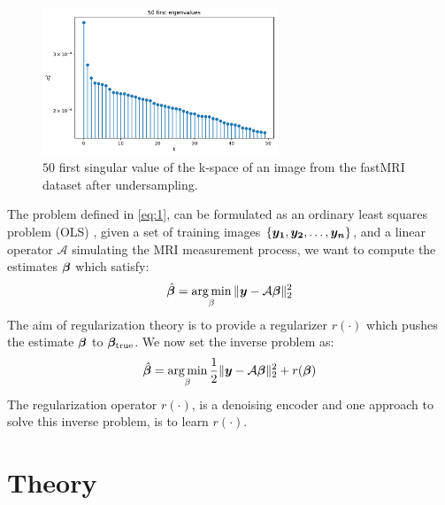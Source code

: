 \documentclass{article}
\begin{document}
\begin{figure}[H]
		\centering
		\captionsetup{justification=centering}
		\includegraphics[width=200pt]{variance_plot_log.pdf}
		\caption{$50$ first singular value of the k-space of an image from the fastMRI dataset after undersampling.}
\end{figure}
The problem defined in \eqref{eq:1}, can be formulated as an ordinary least squares problem (OLS) , given a set of training images $\{\bm{y_1}, \bm{y_2}, \ldots, \bm{y_n}\}$, and a linear operator $\mathcal{A}$ simulating the MRI measurement process, we want to compute the estimates 
$\bm{\beta}$ which satisfy:
$$
\hat{\bm{\beta}}  =  \operatorname*{arg\,min}_{\beta} \| \bm{y} -\mathcal{A} \bm{\beta} \|_2^2
$$
The aim of regularization theory is to provide a regularizer $r(\cdot)$ which pushes the estimate $\bm{\beta}$ to $\bm{\beta}_{\text{true}}$. We now set the inverse problem as:
$$
\hat{\bm{\beta}}  =  \operatorname*{arg\,min}_{\beta} \frac{1}{2} \| \bm{y} -\mathcal{A} \bm{\beta} \|_2^2 + r(\bm{\beta})
$$
The regularization operator $r(\cdot)$, is a denoising encoder and one approach to solve this inverse problem, is to learn $r(\cdot)$. 
 
\section{Theory}
\label{Theory}
\end{document}
